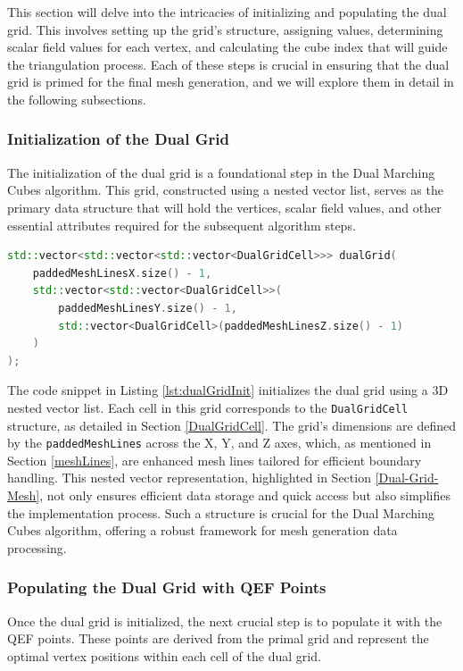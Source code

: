 This section will delve into the intricacies of initializing and populating the dual grid. This involves setting up the grid's structure, assigning values, determining scalar field values for each vertex, and calculating the cube index that will guide the triangulation process. Each of these steps is crucial in ensuring that the dual grid is primed for the final mesh generation, and we will explore them in detail in the following subsections.

\subsubsection{Initialization of the Dual Grid}

The initialization of the dual grid is a foundational step in the Dual Marching Cubes algorithm. This grid, constructed using a nested vector list, serves as the primary data structure that will hold the vertices, scalar field values, and other essential attributes required for the subsequent algorithm steps.

\vspace{2mm}
\begin{lstlisting}[language=C++, caption=Initializing the Dual Grid, label=lst:dualGridInit]
std::vector<std::vector<std::vector<DualGridCell>>> dualGrid(
    paddedMeshLinesX.size() - 1,
    std::vector<std::vector<DualGridCell>>(
        paddedMeshLinesY.size() - 1,
        std::vector<DualGridCell>(paddedMeshLinesZ.size() - 1)
    )
);
\end{lstlisting}
The code snippet in Listing \ref{lst:dualGridInit} initializes the dual grid using a 3D nested vector list. Each cell in this grid corresponds to the \texttt{DualGridCell} structure, as detailed in Section \ref{DualGridCell}. The grid's dimensions are defined by the \texttt{paddedMeshLines} across the X, Y, and Z axes, which, as mentioned in Section \ref{meshLines}, are enhanced mesh lines tailored for efficient boundary handling. This nested vector representation, highlighted in Section \ref{Dual-Grid-Mesh}, not only ensures efficient data storage and quick access but also simplifies the implementation process. Such a structure is crucial for the Dual Marching Cubes algorithm, offering a robust framework for mesh generation data processing.

\subsubsection{Populating the Dual Grid with QEF Points}
Once the dual grid is initialized, the next crucial step is to populate it with the QEF points. These points are derived from the primal grid and represent the optimal vertex positions within each cell of the dual grid.

